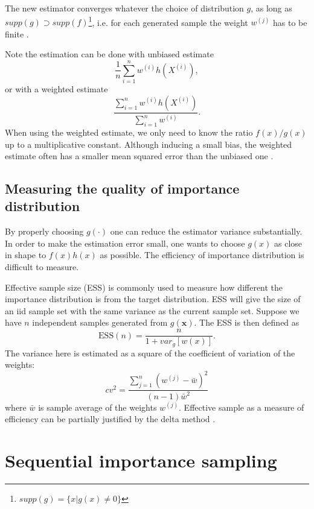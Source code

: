 \documentclass[times, utf8, diplomski]{fer}
\begin{document}
The new estimator converges whatever the choice of distribution $g$, as long as $supp(g) \supset supp(f)$\footnote{$supp(g) = \{x | g(x) \neq 0\}$},  i.e. for each generated sample the weight $w^{(j)}$ has to be finite \cite{RobertMCS}. 

Note the estimation can be done with unbiased estimate
\begin{equation}
\frac{1}{n}\sum_{i=1}^{n}w^{(i)}h(X^{(i)}),
\end{equation}
or with a weighted estimate
\begin{equation}
\frac{\sum_{i=1}^{n}w^{(i)}h(X^{(i)})}{ \sum_{i=1}^{n}w^{(i)}}.
\label{wei_est}
\end{equation}
When using the weighted estimate, we only need to know the ratio $f(x)/g(x)$ up to a multiplicative constant. Although inducing a small bias, the weighted estimate often has a smaller mean squared error than the unbiased one \cite{RobertMCS}.

\subsection{Measuring the quality of importance distribution}
\label{sec_vc2}
By properly choosing $g(\cdot)$ one can reduce the estimator variance substantially. In order to make the estimation error small, one wants to choose $g(x)$ as close in shape to $f(x)h(x)$ as possible. The efficiency of importance distribution is difficult to measure. 

Effective sample size (ESS) is commonly used to measure how different the importance distribution is from the target  distribution. ESS will give the size of an iid sample set with the same variance as the current sample set.
Suppose we have $n$ independent samples generated from $g(\mathbf{x})$. The ESS is then defined as 
\begin{equation}
\text{ESS}(n) = \frac{n}{1 + var_g[w(x)]}.
\end{equation}  
The variance here is estimated as a square of the coefficient of variation of the weights:
\begin{equation}
cv^2 = \frac{\sum_{j=1}^{n} (w^{(j)} - \bar{w})^2}{(n - 1)\bar{w}^2}
\label{cv2}
\end{equation}
where $\bar{w}$ is sample average of the weights $w^{(j)}$. Effective sample as a measure of efficiency can be partially justified by the delta method \cite{Liu}.

\section{Sequential importance sampling}
\end{document}
